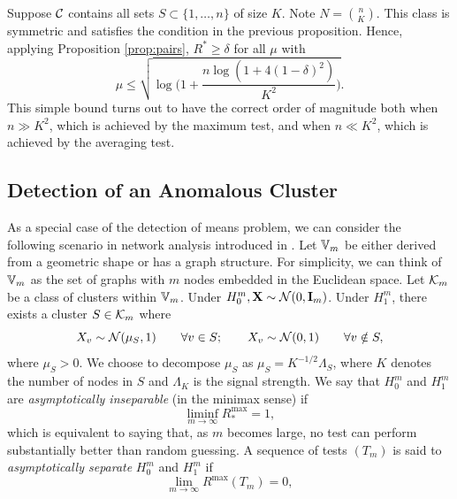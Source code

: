 \documentclass[10pt, oneside]{article}
\begin{document}
\begin{exmp}
  Suppose ${\mathcal C}$ contains all sets $S \subset\{1,\ldots ,n\}$ of size $K$. Note $N={n\choose K}$. This class is symmetric and satisfies the condition in the previous proposition. Hence, applying Proposition \ref{prop:pairs}, $R^*\ge\delta$ for all $\mu$ with
  \[
  \mu\le\sqrt{\log\biggl(1+\frac{n\log(1+4(1-\delta)^2)}{K^2} \biggr)}.
  \]
  This simple bound turns out to have the correct order of magnitude both when $n \gg K^2$, which is achieved by the maximum test, and when $n \ll K^2$, which is achieved by the averaging test.
\end{exmp}


\subsection{Detection of an Anomalous Cluster}
As a special case of the detection of means problem, we can consider the following scenario in network analysis introduced in \cite{arias2011detection}.
Let $\mathbb V_m$ be either derived from a geometric shape or has a graph structure. For simplicity, we can think of $\mathbb V_m$ as the set of graphs with $m$ nodes embedded in the Euclidean space. Let ${\mathcal K}_m$ be a class of clusters within $\mathbb V_m$. Under $H_0^m, \mathbf{X} \sim {\mathcal N}(0, \mathbf{I}_m)$. Under $H_1^m$, there exists a cluster $S \in {\mathcal K}_m$ where 
\[
X_v \sim{\mathcal N}(\mu_S,1)\qquad \forall v \in S;\qquad X_v \sim {\mathcal N}(0,1)\qquad \forall v \notin S,
\]
where $\mu_S > 0$. We choose to decompose $\mu_S$ as $\mu_S = K^{-1/2} \Lambda_S$, where
$K$ denotes the number of nodes in $S$ and $\Lambda_K$ is the signal strength. We say that $H_0^m$ and $H_1^m$ are {\it asymptotically inseparable} (in the minimax sense) if
\[
\liminf_{m \to\infty} R_{*}^{\max} = 1,
\]
which is equivalent to saying that, as $m$ becomes large, no test can perform substantially better than random guessing. A sequence of tests $(T_m)$ is said to {\it asymptotically separate} $H
_0^m$ and $H_1^m$ if
\[
\lim_{m \to\infty} R^{\max}(T_m) = 0,
\]
\end{document}
